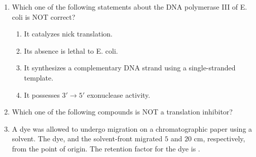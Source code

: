 \documentclass[journal,12pt,onecolumn]{IEEEtran}
\theoremstyle{remark}
\begin{document}
\begin{enumerate}
    \hfill{}
    \begin{enumerate}
    \end{enumerate}

    \item Which one of the following statements about the DNA polymerase III of E. coli is NOT correct?

    \hfill{}
    \begin{enumerate}
        \item It catalyzes nick translation.
        \item Its absence is lethal to E. coli.
        \item It synthesizes a complementary DNA strand using a single-stranded template.
        \item It possesses $3' \rightarrow 5'$ exonuclease activity.
    \end{enumerate}

    \item Which one of the following compounds is NOT a translation inhibitor?

    \hfill{}
    \begin{enumerate}
    \end{enumerate}

    \item A dye was allowed to undergo migration on a chromatographic paper using a solvent. The dye, and the solvent-front migrated $5$ and $20$ cm, respectively, from the point of origin. The retention factor  for the dye is \underline{\hspace{2cm}}.


\end{enumerate}
\end{document}
